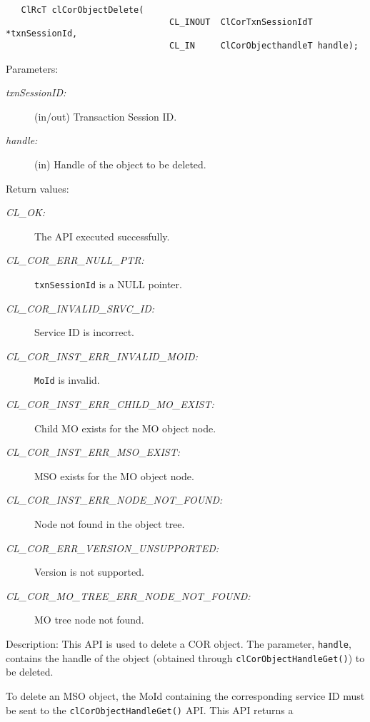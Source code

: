 \begin{flushleft}
\begin{Desc}
\footnotesize\begin{verbatim}   ClRcT clCorObjectDelete(
                         		CL_INOUT  ClCorTxnSessionIdT *txnSessionId,
                         		CL_IN     ClCorObjecthandleT handle);
\end{verbatim}
\normalsize
\end{Desc}
\begin{Desc}
\item[Parameters:]
\begin{description}
\item[{\em txn\-Session\-ID:}] (in/out) Transaction Session ID. 
\item[{\em handle:}](in) Handle of the object to be deleted.\end{description}
\end{Desc}
\begin{Desc}
\item[Return values:]
\begin{description}
\item[{\em CL\_\-OK:}]The API executed successfully. 
\item[{\em CL\_\-COR\_\-ERR\_\-NULL\_\-PTR:}]{\tt{txnSessionId}} is a NULL pointer. 
\item[{\em CL\_\-COR\_\-INVALID\_\-SRVC\_\-ID:}]Service ID is incorrect. 
\item[{\em CL\_\-COR\_\-INST\_\-ERR\_\-INVALID\_\-MOID:}]{\tt{MoId}} is invalid. 
\item[{\em CL\_\-COR\_\-INST\_\-ERR\_\-CHILD\_\-MO\_\-EXIST:}]Child MO exists for the MO object node. 
\item[{\em CL\_\-COR\_\-INST\_\-ERR\_\-MSO\_\-EXIST:}]MSO exists for the MO object node. 
\item[{\em CL\_\-COR\_\-INST\_\-ERR\_\-NODE\_\-NOT\_\-FOUND:}]Node not found in the object tree. 
\item[{\em CL\_\-COR\_\-ERR\_\-VERSION\_\-UNSUPPORTED:}]Version is not supported. 
\item[{\em CL\_\-COR\_\-MO\_\-TREE\_\-ERR\_\-NODE\_\-NOT\_\-FOUND:}]MO tree node not found.
\end{description}
\end{Desc}
\begin{Desc}
\item[Description:]This API is used to delete a COR object. The parameter, {\tt{handle}}, contains the handle of the object (obtained through 
{\tt{clCorObjectHandleGet()}}) to be deleted.  
\par
To delete an MSO object, the MoId containing the corresponding service ID must be sent to the {\tt{clCorObjectHandleGet()}} API. This API returns a 

\end{Desc}
\end{flushleft}
